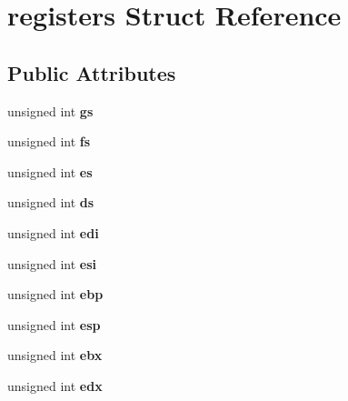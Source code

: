 \hypertarget{structregisters}{}\section{registers Struct Reference}
\label{structregisters}
\subsection*{Public Attributes}
\begin{DoxyCompactItemize}
\item 
\mbox{\label{structregisters_aa980ef689cbab7a013a423907adc085b}} 
unsigned int {\bfseries gs}
\item 
\mbox{\label{structregisters_afb07fabe70bed876309028cdc4624d0e}} 
unsigned int {\bfseries fs}
\item 
\mbox{\label{structregisters_ab926575ad9f563ce304c00eea4db7ed6}} 
unsigned int {\bfseries es}
\item 
\mbox{\label{structregisters_a6be65e194f8da29825fc8d3319cbae55}} 
unsigned int {\bfseries ds}
\item 
\mbox{\label{structregisters_af5a0317b54c00546ce76301dd5937dab}} 
unsigned int {\bfseries edi}
\item 
\mbox{\label{structregisters_a84dc319eeb9a81f8895cae68820e18a1}} 
unsigned int {\bfseries esi}
\item 
\mbox{\label{structregisters_a0ed9744596c42fdc8813fe4511561a8e}} 
unsigned int {\bfseries ebp}
\item 
\mbox{\label{structregisters_af0b941e5d5554e403af99d130d258bb2}} 
unsigned int {\bfseries esp}
\item 
\mbox{\label{structregisters_a57314a9c03ded9bfe8c5da142911d81a}} 
unsigned int {\bfseries ebx}
\item 
\mbox{\label{structregisters_a6822f89a9efe195508b3584dbdf255c6}} 
unsigned int {\bfseries edx}
\item 

\end{DoxyCompactItemize}
